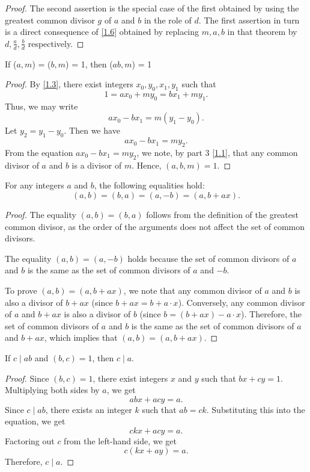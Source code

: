 \documentclass[11pt]{article}
\begin{document}
\begin{proof}
	The second assertion is the special case of the first obtained by using the greatest common divisor \(g\) of \(a\) and \(b\) in the role of \(d\). The first assertion in turn is a direct consequence of \cref{1.6} obtained by replacing \(m, a, b\) in that theorem by \(d, \frac{a}{d}, \frac{b}{d}\) respectively.
\end{proof}

\begin{theorem}\label{1.8}
	If (\(a, m\)) = (\(b, m\)) = 1, then (\(ab, m\)) = 1
\end{theorem}
\begin{proof}
	By \cref{1.3}, there exist integers \(x_0, y_0, x_1, y_1\) such that
	\[1 = ax_0 + my_0 = bx_1 + my_1.\]
	Thus, we may write
	\[
		a x_0 - b x_1 = m (y_1 - y_0).
	\]
	Let \(y_2 = y_1 - y_0\). Then we have
	\[
		a x_0 - b x_1 = m y_2.
	\]
	From the equation \(a x_0 - b x_1 = m y_2\), we note, by part 3 \cref{1.1},
	that any common divisor of \(a\) and \(b\) is a divisor of \(m\). Hence, \((a,
	b, m) = 1\).
\end{proof}
\begin{theorem}\label{1.9}
	For any integers \(a\) and \(b\), the following equalities hold:
	\[
		(a, b) = (b, a) = (a, -b) = (a, b + ax).
	\]
\end{theorem}
\begin{proof}
	The equality \((a, b) = (b, a)\) follows from the definition of the greatest common divisor, as the order of the arguments does not affect the set of common divisors.

	The equality \((a, b) = (a, -b)\) holds because the set of common divisors of
	\(a\) and \(b\) is the same as the set of common divisors of \(a\) and \(-b\).

	To prove \((a, b) = (a, b + ax)\), we note that any common divisor of \(a\) and
	\(b\) is also a divisor of \(b + ax\) (since \(b + ax = b + a \cdot x\)).
	Conversely, any common divisor of \(a\) and \(b + ax\) is also a divisor of
	\(b\) (since \(b = (b + ax) - a \cdot x\)). Therefore, the set of common
	divisors of \(a\) and \(b\) is the same as the set of common divisors of \(a\)
	and \(b + ax\), which implies that \((a, b) = (a, b + ax)\).
\end{proof}
\begin{theorem}\label{1.10}
	If \(c \mid ab\) and \((b, c) = 1\), then \(c \mid a\).
\end{theorem}

\begin{proof}
	Since \((b, c) = 1\), there exist integers \(x\) and \(y\) such that \(bx + cy = 1\). Multiplying both sides by \(a\), we get
	\[
		abx + acy = a.
	\]
	Since \(c \mid ab\), there exists an integer \(k\) such that \(ab = ck\).
	Substituting this into the equation, we get
	\[
		ckx + acy = a.
	\]
	Factoring out \(c\) from the left-hand side, we get
	\[
		c(kx + ay) = a.
	\]
	Therefore, \(c \mid a\).
\end{proof}
\end{document}
